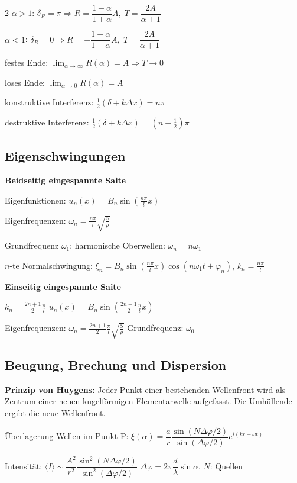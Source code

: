 \documentclass[10pt,a4paper]{article}
\newcommand{\bhbox}[1]{%
  \par\vspace{2pt}\noindent%
  \colorbox{blue!12}{\parbox{\dimexpr\linewidth-2\fboxsep\relax}{\small#1}}%
  \par\vspace{2pt}}
\begin{document}
\begin{multicols}{2}
$\alpha>1$: $\boxed{\delta_R=\pi\Rightarrow R=\dfrac{1-\alpha}{1+\alpha}A,\;T=\dfrac{2A}{\alpha+1}}$

$\alpha<1$: $\boxed{\delta_R=0\Rightarrow R=-\dfrac{1-\alpha}{1+\alpha}A,\;T=\dfrac{2A}{\alpha+1}}$

festes Ende: $\lim_{\alpha\to\infty}R(\alpha)=A\Rightarrow T\to0$

loses Ende: $\lim_{\alpha\to0}R(\alpha)=A$

konstruktive Interferenz: $\tfrac{1}{2}(\delta+k\Delta x)=n\pi$

destruktive Interferenz: $\tfrac{1}{2}(\delta+k\Delta x)=(n+\tfrac{1}{2})\pi$

\subsection{Eigenschwingungen}

\textbf{Beidseitig eingespannte Saite}

Eigenfunktionen: $u_n(x)=B_n\sin\!\left(\frac{n\pi}{l}x\right)$

Eigenfrequenzen: $\omega_n=\frac{n\pi}{l}\sqrt{\frac{S}{\rho}}$

Grundfrequenz $\omega_1$; harmonische Oberwellen: $\omega_n=n\omega_1$

$n$-te Normalschwingung: $\xi_n=B_n\sin\!\left(\frac{n\pi}{l}x\right)\cos(n\omega_1 t+\varphi_n)$, $k_n=\frac{n\pi}{l}$

\textbf{Einseitig eingespannte Saite}

$k_n=\frac{2n+1}{2}\frac{\pi}{l}$ \quad $u_n(x)=B_n\sin\!\left(\frac{2n+1}{2}\frac{\pi}{l}x\right)$

Eigenfrequenzen: $\omega_n=\frac{2n+1}{2}\frac{\pi}{l}\sqrt{\frac{S}{\rho}}$ \quad Grundfrequenz: $\omega_0$

\subsection{Beugung, Brechung und Dispersion}

\bhbox{\textbf{Prinzip von Huygens:} Jeder Punkt einer bestehenden Wellenfront wird als Zentrum einer neuen kugelförmigen Elementarwelle aufgefasst. Die Umhüllende ergibt die neue Wellenfront.}

Überlagerung Wellen im Punkt P:
$\xi(\alpha)=\dfrac{a}{r}\dfrac{\sin(N\Delta\varphi/2)}{\sin(\Delta\varphi/2)}e^{i(kr-\omega t)}$

Intensität: $\langle I\rangle\sim\dfrac{A^2}{r^2}\dfrac{\sin^2(N\Delta\varphi/2)}{\sin^2(\Delta\varphi/2)}$ \quad $\Delta\varphi=2\pi\dfrac{d}{\lambda}\sin\alpha$, $N$: Quellen


\end{multicols}
\end{document}
